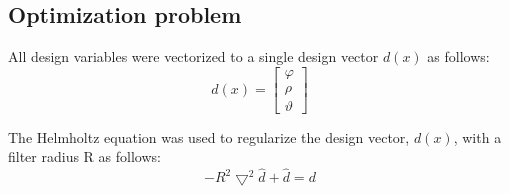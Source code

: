 \documentclass[a4paper,7pt,fleqn]{article}   %
\begin{document}
\begin{multicols}{2}
		\subsection{Optimization problem}
		All design variables were vectorized to a single design vector $d(x)$ as follows:
		\begin{equation}
			d(x)=\begin{bmatrix}\varphi  \\\rho  \\\vartheta \end{bmatrix}
			\label{eq8}
		\end{equation}   \par
		The Helmholtz equation was used to regularize the design vector,
		$d(x)$, with a filter radius R \cite{r23} as follows:
		\begin{equation}
			-R^{2} \bigtriangledown ^{2} \hat{d} +\hat{d} =d
			\label{eq9}
		\end{equation}
		

\end{multicols}
\end{document}
